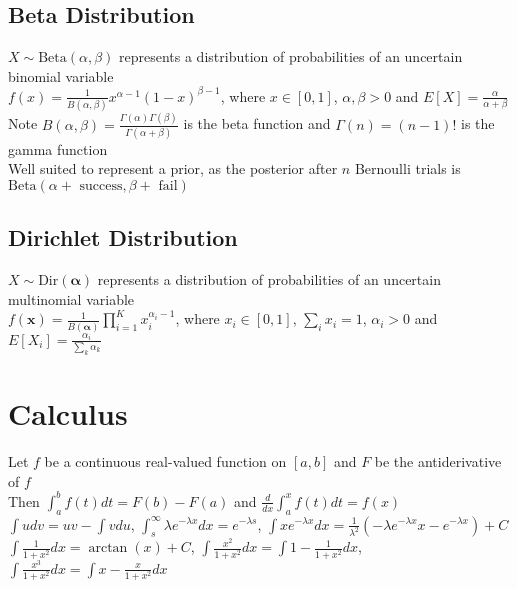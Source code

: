 \documentclass{article}
\begin{document}
\subsection{Beta Distribution}
$X \sim \mbox{Beta}(\alpha, \beta)$ represents a distribution of probabilities of an uncertain binomial variable \\
$f(x) = \frac{1}{B(\alpha, \beta)}x^{\alpha -1}(1-x)^{\beta - 1}$, where $x \in [0, 1]$, $\alpha, \beta > 0$ and $E[X] = \frac{\alpha}{\alpha + \beta}$ \\
Note $B(\alpha, \beta) = \frac{\Gamma(\alpha)\Gamma(\beta)}{\Gamma(\alpha + \beta)}$ is the beta function and $\Gamma(n) = (n-1)!$ is the gamma function \\
Well suited to represent a prior, as the posterior after $n$ Bernoulli trials is $\mbox{Beta}(\alpha + \mbox{ success}, \beta + \mbox{ fail})$

\subsection{Dirichlet Distribution}
$X \sim \mbox{Dir}(\boldsymbol \alpha)$ represents a distribution of probabilities of an uncertain multinomial variable \\
$f(\boldsymbol x) = \frac{1}{B(\boldsymbol \alpha)} \prod\limits_{i=1}^Kx_{i}^{\alpha_i -1}$, where $x_i \in [0, 1]$, $\sum_i x_i = 1$, $\alpha_i > 0$ and $E[X_i] = \frac{\alpha_i}{\sum_k \alpha_k}$

\section{Calculus}
Let $f$ be a continuous real-valued function on $[a, b]$ and $F$ be the antiderivative of $f$ \\
Then $\int_a^b f(t) dt = F(b) - F(a)$ and $\frac{d}{dx}\int_a^x f(t)dt = f(x)$ \\
$\int udv = uv - \int vdu$, $\int_{s}^{\infty}\lambda e^{-\lambda x}dx = e^{-\lambda s}$, $\int xe^{-\lambda x}dx = \frac{1}{\lambda^2}(-\lambda e^{-\lambda x}x -e^{-\lambda x}) + C$ \\
$\int \frac{1}{1+x^2}dx = \arctan(x) + C$, $\int \frac{x^2}{1+x^2} dx = \int 1 - \frac{1}{1+x^2}dx$, $\int \frac{x^3}{1+x^2} dx = \int x - \frac{x}{1+x^2}dx$ 
\end{document}
